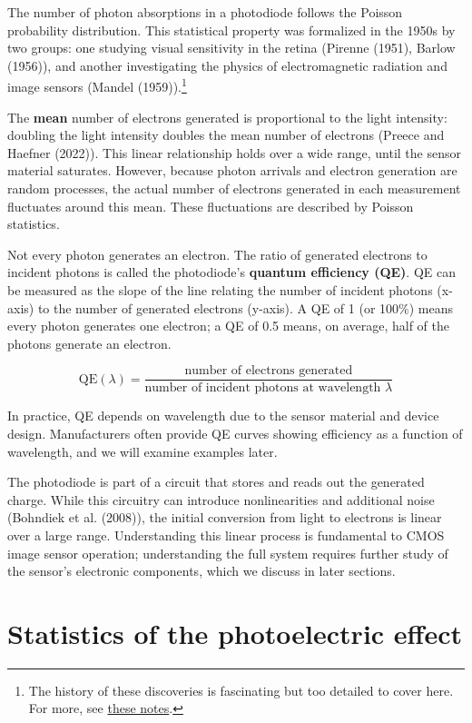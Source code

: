 \documentclass[
  letterpaper,
]{book}
\begin{document}
The number of photon absorptions in a photodiode follows the Poisson
probability distribution. This statistical property was formalized in
the 1950s by two groups: one studying visual sensitivity in the retina
(Pirenne (1951), Barlow (1956)), and another investigating the physics
of electromagnetic radiation and image sensors (Mandel
(1959)).\footnote{The history of these discoveries is fascinating but
  too detailed to cover here. For more, see
  \href{resources/Poisson-history.html}{these notes}.}

The \textbf{mean} number of electrons generated is proportional to the
light intensity: doubling the light intensity doubles the mean number of
electrons (Preece and Haefner (2022)). This linear relationship holds
over a wide range, until the sensor material saturates. However, because
photon arrivals and electron generation are random processes, the actual
number of electrons generated in each measurement fluctuates around this
mean. These fluctuations are described by Poisson statistics.

Not every photon generates an electron. The ratio of generated electrons
to incident photons is called the photodiode's \textbf{quantum
efficiency (QE)}. QE can be measured as the slope of the line relating
the number of incident photons (x-axis) to the number of generated
electrons (y-axis). A QE of 1 (or 100\%) means every photon generates
one electron; a QE of 0.5 means, on average, half of the photons
generate an electron.

\[
\mathrm{QE}(\lambda) = \frac{\text{number of electrons generated}}{\text{number of incident photons at wavelength } \lambda}
\]

In practice, QE depends on wavelength due to the sensor material and
device design. Manufacturers often provide QE curves showing efficiency
as a function of wavelength, and we will examine examples later.

The photodiode is part of a circuit that stores and reads out the
generated charge. While this circuitry can introduce nonlinearities and
additional noise (Bohndiek et al. (2008)), the initial conversion from
light to electrons is linear over a large range. Understanding this
linear process is fundamental to CMOS image sensor operation;
understanding the full system requires further study of the sensor's
electronic components, which we discuss in later sections.

\section{Statistics of the photoelectric effect}\label{sec-shot-noise}
\end{document}
